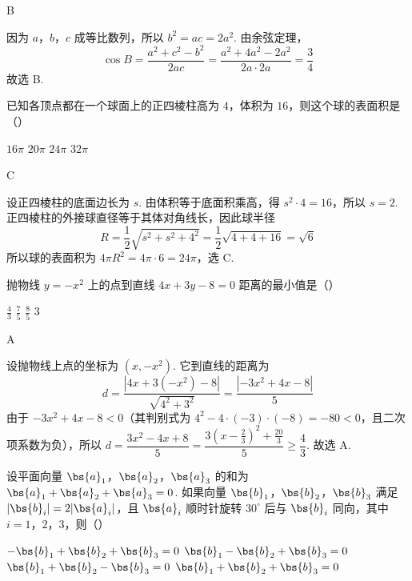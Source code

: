 \begin{answer}
B
\end{answer}

\begin{solution}
因为 \(a\)，\(b\)，\(c\) 成等比数列，所以 \(b^2=ac=2a^2\). 由余弦定理，
\[
\cos B=\frac{a^2+c^2-b^2}{2ac}=\frac{a^2+4a^2-2a^2}{2a\cdot2a}=\frac34
\]
故选 B.
\end{solution}

\begin{problem}
已知各顶点都在一个球面上的正四棱柱高为 \(4\)，体积为 \(16\)，则这个球的表面积是（\quad）

\choices
    {\(16\pi\)}
    {\(20\pi\)}
    {\(24\pi\)}
    {\(32\pi\)}
\end{problem}

\begin{answer}
C
\end{answer}

\begin{solution}
设正四棱柱的底面边长为 \(s\). 由体积等于底面积乘高，得 \(s^2\cdot4=16\)，所以 \(s=2\). 正四棱柱的外接球直径等于其体对角线长，因此球半径
\[
R=\frac12\sqrt{s^2+s^2+4^2}=\frac12\sqrt{4+4+16}=\sqrt6
\]
所以球的表面积为 \(4\pi R^2=4\pi\cdot6=24\pi\)，选 C.
\end{solution}

\begin{problem}
抛物线 \(y=-x^2\) 上的点到直线 \(4x+3y-8=0\) 距离的最小值是（\quad）

\choices
    {\(\frac43\)}
    {\(\frac75\)}
    {\(\frac85\)}
    {\(3\)}
\end{problem}

\begin{answer}
A
\end{answer}

\begin{solution}
设抛物线上点的坐标为 \((x,-x^2)\). 它到直线的距离为
\[
d=\frac{|4x+3(-x^2)-8|}{\sqrt{4^2+3^2}}=\frac{|-3x^2+4x-8|}{5}
\]
由于 \(-3x^2+4x-8<0\)（其判别式为 \(4^2-4\cdot(-3)\cdot(-8)=-80<0\)，且二次项系数为负），所以 \(d=\dfrac{3x^2-4x+8}{5}=\dfrac{3\left(x-\frac23\right)^2+\frac{20}{3}}{5}\geq\dfrac43\). 故选 A.
\end{solution}

\begin{problem}
设平面向量 \(\bs{a}_1\)，\(\bs{a}_2\)，\(\bs{a}_3\) 的和为 \(\bs{a}_1+\bs{a}_2+\bs{a}_3=0\). 如果向量 \(\bs{b}_1\)，\(\bs{b}_2\)，\(\bs{b}_3\) 满足 \(|\bs{b}_i|=2|\bs{a}_i|\)，且 \(\bs{a}_i\) 顺时针旋转 \(30^{\circ}\) 后与 \(\bs{b}_i\) 同向，其中 \(i=1\)，\(2\)，\(3\)，则（\quad）

\choices
    {\(-\bs{b}_1+\bs{b}_2+\bs{b}_3=0\)}
    {\(\bs{b}_1-\bs{b}_2+\bs{b}_3=0\)}
    {\(\bs{b}_1+\bs{b}_2-\bs{b}_3=0\)}
    {\(\bs{b}_1+\bs{b}_2+\bs{b}_3=0\)}
\end{problem}


